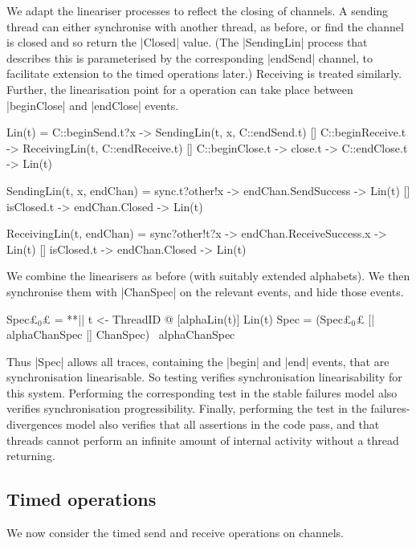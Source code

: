 We adapt the lineariser processes to reflect the closing of channels.  A
sending thread can either synchronise with another thread, as before, or find
the channel is closed and so return the |Closed| value.  (The |SendingLin|
process that describes this is parameterised by the corresponding |endSend|
channel, to facilitate extension to the timed operations later.)  Receiving is
treated similarly.  Further, the linearisation point for a 
operation can take place between |beginClose| and |endClose| events.
%
\begin{cspm}
Lin(t) = 
  C::beginSend.t?x -> SendingLin(t, x, C::endSend.t)
  [] C::beginReceive.t -> ReceivingLin(t, C::endReceive.t)
  [] C::beginClose.t -> close.t -> C::endClose.t -> Lin(t)

SendingLin(t, x, endChan) = 
  sync.t?other!x -> endChan.SendSuccess -> Lin(t)
  [] isClosed.t -> endChan.Closed -> Lin(t)

ReceivingLin(t, endChan) =  
  sync?other!t?x -> endChan.ReceiveSuccess.x -> Lin(t)
  [] isClosed.t -> endChan.Closed -> Lin(t)
\end{cspm}

We combine the linearisers as before (with suitably extended alphabets).  We
then synchronise them with |ChanSpec| on the relevant events, and hide those
events.
%
\begin{cspm}
Spec£$_0$£ = **|| t <- ThreadID @ [alphaLin(t)] Lin(t)
Spec = (Spec£$_0$£ [| alphaChanSpec |] ChanSpec) \ alphaChanSpec
\end{cspm}
%
Thus |Spec| allows all traces, containing the |begin| and |end| events, that
are synchronisation linearisable.  So testing \CSPM{Spec [T= System}
verifies synchronisation linearisability for this system.  Performing the
corresponding test in the stable failures model also verifies synchronisation
progressibility.  Finally, performing the test in the failures-divergences
model also verifies that all assertions in the code pass, and that threads
cannot perform an infinite amount of internal activity without a thread
returning.


\subsection{Timed operations}
\label{sec:syncchan-timed}

\inlineScala

We now consider the timed send and receive operations on channels.  

